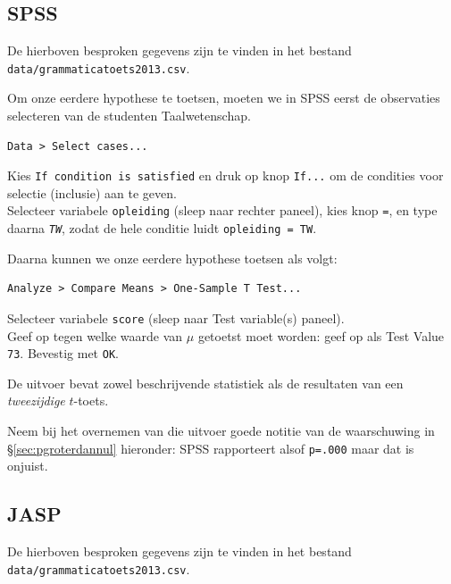 \documentclass[
]{book}
\begin{document}
\subsection{SPSS}\label{spss-10}

De hierboven besproken gegevens zijn te vinden in het bestand
\texttt{data/grammaticatoets2013.csv}.

Om onze eerdere hypothese te toetsen, moeten we in SPSS eerst de
observaties selecteren van de studenten Taalwetenschap.

\begin{verbatim}
Data > Select cases...
\end{verbatim}

Kies \texttt{If\ condition\ is\ satisfied} en druk op knop \texttt{If...} om de condities
voor selectie (inclusie) aan te geven.\\
Selecteer variabele \texttt{opleiding} (sleep naar rechter paneel), kies knop
\texttt{=}, en type daarna \emph{\texttt{TW}}, zodat de hele conditie luidt
\texttt{opleiding\ =\ TW}.

Daarna kunnen we onze eerdere hypothese toetsen als volgt:

\begin{verbatim}
Analyze > Compare Means > One-Sample T Test...
\end{verbatim}

Selecteer variabele \texttt{score} (sleep naar Test variable(s) paneel).\\
Geef op tegen welke waarde van \(\mu\) getoetst moet worden: geef op als
Test Value \texttt{73}. Bevestig met \texttt{OK}.

De uitvoer bevat zowel beschrijvende statistiek als de resultaten van
een \emph{tweezijdige} \(t\)-toets.

Neem bij het overnemen van die uitvoer goede notitie van de waarschuwing
in §\ref{sec:pgroterdannul} hieronder: SPSS rapporteert alsof \texttt{p=.000}
maar dat is onjuist.

\subsection{JASP}\label{sec:jaspttoetsenkel}

De hierboven besproken gegevens zijn te vinden in het bestand
\texttt{data/grammaticatoets2013.csv}.
\end{document}
